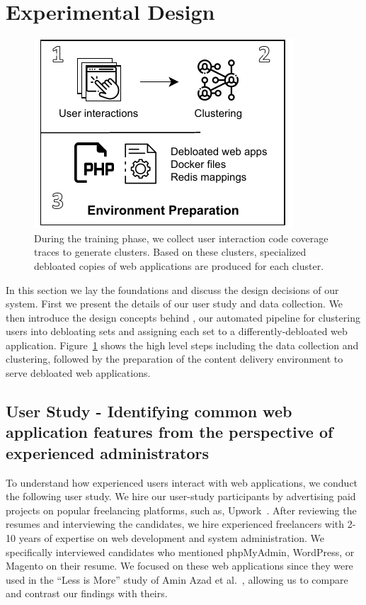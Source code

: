 \section{Experimental Design}

\begin{figure}[t]
    \centering
    \includegraphics[]{figures/dbltr/EnvironmentPreparation.pdf}
    \caption{During the training phase, we collect user interaction code coverage traces to generate clusters. Based on these clusters, specialized debloated copies of web applications are produced for each cluster.}
    \label{fig:environment_preparation}
\end{figure}

In this section we lay the foundations and discuss the design decisions of our system. 
First we present the details of our user study and data collection. 
We then introduce the design concepts behind \dbltr{}, our automated pipeline for clustering users into debloating sets and assigning each set to a differently-debloated web application.
Figure~\ref{fig:environment_preparation} shows the high level steps including the data collection and clustering, followed by the preparation of the content delivery environment to serve debloated web applications.

\subsection{User Study - Identifying common web application features from the perspective of experienced administrators}

To understand how experienced users interact with web applications, we conduct the following user study. 
We hire our user-study participants by advertising paid projects on popular freelancing platforms, such as, Upwork~\cite{upwork}. 
After reviewing the resumes and interviewing the candidates, we hire experienced freelancers with 2-10 years of expertise on web development and system administration. 
We specifically interviewed candidates who mentioned phpMyAdmin, WordPress, or Magento on their resume. We focused on these web applications since they were used in the ``Less is More'' study of Amin Azad et al.~\cite{lessismore}, allowing us to compare and contrast our findings with theirs. 

